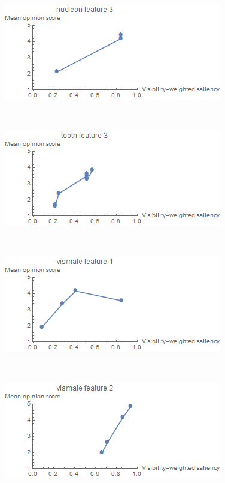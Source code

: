 \begin{figure}
	\begin{minipage}{.24\textwidth}
		\includegraphics[width=1\linewidth]{images/mos_vs_metric_nucleon_feature_3}
		\subcaption{}
	\end{minipage}~
	\begin{minipage}{.24\textwidth}
		\includegraphics[width=1\linewidth]{images/mos_vs_metric_tooth_feature_3}
		\subcaption{}
	\end{minipage}~
	\begin{minipage}{.24\textwidth}
		\includegraphics[width=1\linewidth]{images/mos_vs_metric_vismale_feature_1}
		\subcaption{}
	\end{minipage}~
	\begin{minipage}{.24\textwidth}
		\includegraphics[width=1\linewidth]{images/mos_vs_metric_vismale_feature_2}

\end{minipage}
\end{figure}
